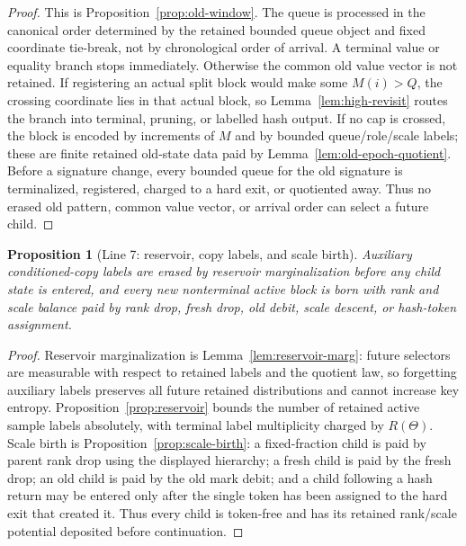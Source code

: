 \documentclass[11pt]{article}
\newtheorem{proposition}[theorem]{Proposition}
\theoremstyle{remark}
\begin{document}
\begin{proof}
This is Proposition~\ref{prop:old-window}.  The queue is processed in the canonical order determined by the retained bounded queue object and fixed coordinate tie-break, not by chronological order of arrival.  A terminal value or equality branch stops immediately.  Otherwise the common old value vector is not retained.  If registering an actual split block would make some $M(i)>Q$, the crossing coordinate lies in that actual block, so Lemma~\ref{lem:high-revisit} routes the branch into terminal, pruning, or labelled hash output.  If no cap is crossed, the block is encoded by increments of $M$ and by bounded queue/role/scale labels; these are finite retained old-state data paid by Lemma~\ref{lem:old-epoch-quotient}.  Before a signature change, every bounded queue for the old signature is terminalized, registered, charged to a hard exit, or quotiented away.  Thus no erased old pattern, common value vector, or arrival order can select a future child.
\end{proof}

\begin{proposition}[Line 7: reservoir, copy labels, and scale birth]\label{prop:line-reservoir-scale}
Auxiliary conditioned-copy labels are erased by reservoir marginalization before any child state is entered, and every new nonterminal active block is born with rank and scale balance paid by rank drop, fresh drop, old debit, scale descent, or hash-token assignment.
\end{proposition}

\begin{proof}
Reservoir marginalization is Lemma~\ref{lem:reservoir-marg}: future selectors are measurable with respect to retained labels and the quotient law, so forgetting auxiliary labels preserves all future retained distributions and cannot increase key entropy.  Proposition~\ref{prop:reservoir} bounds the number of retained active sample labels absolutely, with terminal label multiplicity charged by $R(\Theta)$.  Scale birth is Proposition~\ref{prop:scale-birth}: a fixed-fraction child is paid by parent rank drop using the displayed hierarchy; a fresh child is paid by the fresh drop; an old child is paid by the old mark debit; and a child following a hash return may be entered only after the single token has been assigned to the hard exit that created it.  Thus every child is token-free and has its retained rank/scale potential deposited before continuation.
\end{proof}
\end{document}
